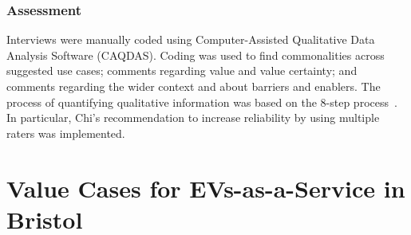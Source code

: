 \documentclass[b5paper,10pt]{article}
\begin{document}
\subsubsection{Assessment}

Interviews were manually coded using Computer-Assisted Qualitative
Data Analysis Software (CAQDAS). Coding was used to find commonalities
across suggested use cases; comments regarding value and value
certainty; and comments regarding the wider context and about barriers
and enablers. The process of quantifying qualitative information was
based on the 8-step process~\citep{chi:1997}. In particular, Chi's
recommendation to increase reliability by using multiple raters was
implemented.

\section{Value Cases for EVs-as-a-Service in Bristol}




\end{document}
